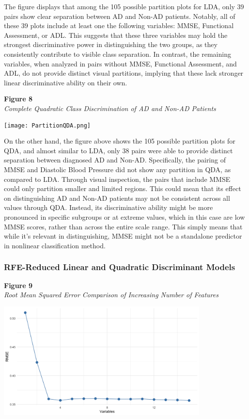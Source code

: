 \documentclass[12pt]{article}
\begin{document}
The figure displays that among the 105 possible partition plots for LDA, only 39 pairs show clear separation between AD and Non-AD patients. Notably, all of these 39 plots include at least one the following
variables: MMSE, Functional Assessment, or ADL. This suggests that these three variables may hold the strongest discriminative power in distinguishing the two groups, as they consistently contribute to visible
class separation. In contrast, the remaining variables, when analyzed in pairs without MMSE, Functional Assessment, and ADL, do not provide distinct visual partitions, implying that these lack stronger linear 
discriminative ability on their own. 

\noindent
\textbf{Figure 8}\\
\textit{Complete Quadratic Class Discrimination of AD and Non-AD Patients}
\begin{center}
    \texttt{[image: PartitionQDA.png]}
\end{center}

On the other hand, the figure above shows the 105 possible partition plots for QDA, and almost similar to LDA, only 38 pairs were able to provide distinct separation between diagnosed AD and Non-AD. Specifically, the pairing of MMSE and Diastolic Blood 
Pressure did not show any partition in QDA, as compared to LDA. Through visual inspection, the pairs that include MMSE could only partition smaller and limited regions. This could mean that its effect on distinguishing AD and Non-AD patients may not be consistent 
across all values through QDA. Instead, its discriminative ability might be more pronounced in specific subgroups or at extreme values, which in this case are low MMSE scores, rather than across the entire scale range. This simply means that while it's relevant in distinguishing, 
MMSE might not be a standalone predictor in nonlinear classification method. 

\subsubsection{RFE-Reduced Linear and Quadratic Discriminant Models}
\textbf{Figure 9}\\
\textit{Root Mean Squared Error Comparison of Increasing Number of Features}
\begin{center}
    \includegraphics[width = 0.8\textwidth]{Required Number of Features.png}
\end{center}
\end{document}

